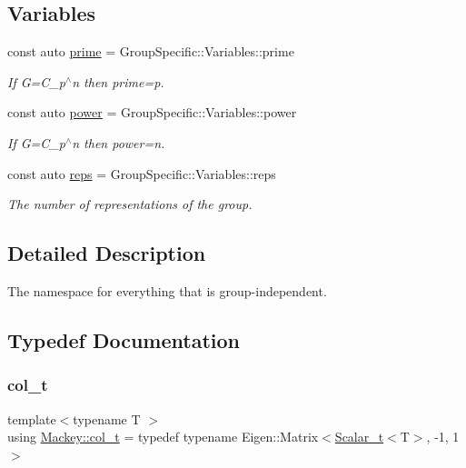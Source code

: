 \subsection*{Variables}
\begin{DoxyCompactItemize}
\item 
const auto \hyperlink{namespaceMackey_a77e059c6f9b4c6ea096fcf94a7880bc3}{prime} = Group\+Specific\+::\+Variables\+::prime
\begin{DoxyCompactList}\small\item\em If G=C\+\_\+p$^\wedge$n then prime=p. \end{DoxyCompactList}\item 
const auto \hyperlink{namespaceMackey_aafdaaabd06dd9ceefe6fa4f26d13a60d}{power} = Group\+Specific\+::\+Variables\+::power
\begin{DoxyCompactList}\small\item\em If G=C\+\_\+p$^\wedge$n then power=n. \end{DoxyCompactList}\item 
const auto \hyperlink{namespaceMackey_af282e8433677f2812cb242359f4cd0c1}{reps} = Group\+Specific\+::\+Variables\+::reps
\begin{DoxyCompactList}\small\item\em The number of representations of the group. \end{DoxyCompactList}\end{DoxyCompactItemize}


\subsection{Detailed Description}
The namespace for everything that is group-\/independent. 

\subsection{Typedef Documentation}
\mbox{\label{namespaceMackey_a3374980e3b5001f5ba9b206004180627}} 
\subsubsection{\texorpdfstring{col\+\_\+t}{col\_t}}
{\footnotesize\ttfamily template$<$typename T $>$ \\
using \hyperlink{namespaceMackey_a3374980e3b5001f5ba9b206004180627}{Mackey\+::col\+\_\+t} = typedef typename Eigen\+::\+Matrix$<$\hyperlink{namespaceMackey_a93ba297573961f91101fb84bc84bbe95}{Scalar\+\_\+t}$<$T$>$, -\/1, 1$>$}



